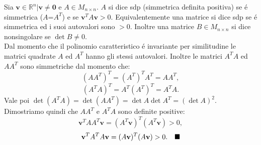 Sia $\mathbf{v} \in \mathbb{R}^n| \mathbf{v} \neq \mathbf{0}$ e $A \in M_{n \times n}$.
$A$ si dice sdp (simmetrica definita positiva) se \'e simmetrica ($A$=$A^T$) e se $\mathbf{v}^TA\mathbf{v} > 0.$
Equivalentemente una matrice si dice sdp se \'e simmetrica ed i suoi autovalori sono $> 0.$
Inoltre una matrice $B \in M_{n \times n}$ si dice nonsingolare se $\det{B} \neq 0.$
\\
Dal momento che il polinomio caratteristico \'e invariante per similitudine le matrici quadrate $A$ ed $A^T$ hanno gli stessi autovalori.
Inoltre le matrici $A^TA$ ed $AA^T$ sono simmetriche dal momento che:
\[
(AA^T)^T = (A^T)^TA^T = AA^T ,\]
\[
(A^TA)^T = A^T(A^T)^T = A^TA.
\]
Vale poi $\det{(A^TA)} = \det{(AA^T)} = \det{A}\det{A^T} = (\det{A})^2.$
\\
Dimostriamo quindi che $AA^T$ e $A^TA$ sono definite positive:
\[
\mathbf{v}^TAA^T\mathbf{v} = (A^T\mathbf{v})^T(A^T\mathbf{v}) > 0, \]
\[
\mathbf{v}^TA^TA\mathbf{v} = (A\mathbf{v})^T(A\mathbf{v}) > 0. \hspace{1em}\blacksquare
\]
